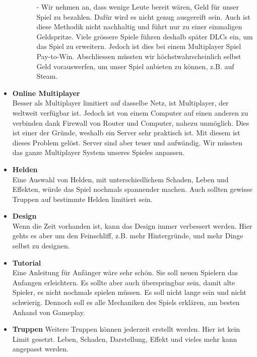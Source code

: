 \begin{itemize}
\begin{enumerate}
\begin{itemize}
            \item[-] Wir nehmen an, dass wenige Leute bereit wären, Geld für unser Spiel zu bezahlen.
                    Dafür wird es nicht genug ausgereift sein.
                    Auch ist diese Methodik nicht nachhaltig und führt nur zu einer einmaligen Geldspritze.
                    Viele grössere Spiele führen deshalb später
                    DLCs ein, um das Spiel zu erweitern.
                    Jedoch ist dies bei einem Multiplayer Spiel Pay-to-Win.
                    Abschliessen müssten wir höchstwahrscheinlich selbst Geld vorauswerfen, um unser Spiel anbieten zu können, z.B. auf Steam.
        \end{itemize}
        
    \end{enumerate}
    \item \textbf{Online Multiplayer} \\
        Besser als Multiplayer limitiert auf dasselbe Netz, ist Multiplayer, der weltweit verfügbar ist. Jedoch ist von einem Computer auf einen anderen zu
        verbinden dank Firewall von Router und Computer, nahezu unmöglich. Dies ist einer der Gründe, weshalb ein Server sehr praktisch ist. Mit diesem ist dieses
        Problem gelöst. Server sind aber teuer und aufwändig. Wir müssten das ganze Multiplayer System unseres Spieles anpassen.
    \item \textbf{Helden} \\
        Eine Auswahl von Helden, mit unterschiedlichem Schaden, Leben und Effekten, würde das Spiel nochmals spannender machen. Auch sollten gewisse Truppen auf bestimmte Helden limitiert sein. 
    \item \textbf{Design} \\
        Wenn die Zeit vorhanden ist, kann das Design immer verbessert werden. Hier gehts es aber um den Feinschliff, z.B. mehr Hintergründe, und mehr Dinge selbst zu designen.
    \item \textbf{Tutorial} \\
        Eine Anleitung für Anfänger wäre sehr schön. Sie soll neuen Spielern das Anfangen erleichtern. Es sollte aber auch überspringbar sein,
        damit alte Spieler, es nicht nochmals spielen müssen. Es soll nicht lange sein und nicht schwierig. Dennoch soll es alle Mechaniken des Spiels
        erklären, am besten Anhand von Gameplay.
    \item \textbf{Truppen}
        Weitere Truppen können jederzeit erstellt werden. Hier ist kein Limit gesetzt. Leben, Schaden, Darstellung, Effekt und vieles mehr kann angepasst werden.

\end{itemize}
